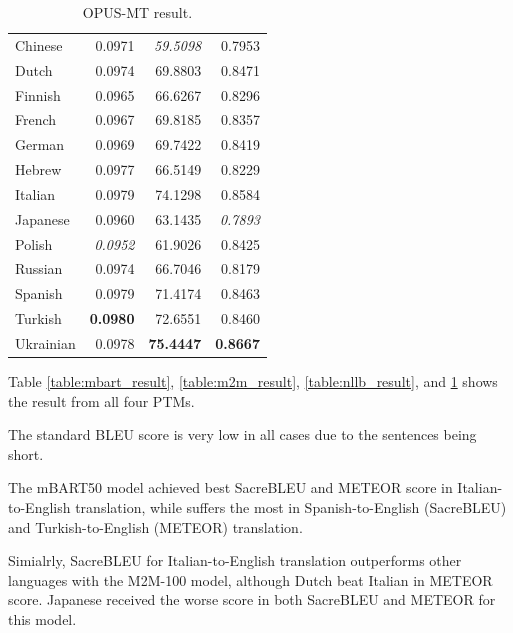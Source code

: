 \documentclass[a4paper]{article}
\begin{document}
\begin{table}[htbp]
\begin{minipage}{0.49\linewidth}
\begin{tabular}{|l|r|r|r|}
            \hline
            Chinese           & 0.0971          & \textit{59.5098}   & 0.7953          \\
            Dutch             & 0.0974          & 69.8803            & 0.8471          \\
            Finnish           & 0.0965          & 66.6267            & 0.8296          \\
            French            & 0.0967          & 69.8185            & 0.8357          \\
            German            & 0.0969          & 69.7422            & 0.8419          \\
            Hebrew            & 0.0977          & 66.5149            & 0.8229          \\
            Italian           & 0.0979          & 74.1298            & 0.8584          \\
            Japanese          & 0.0960          & 63.1435            & \textit{0.7893} \\
            Polish            & \textit{0.0952} & 61.9026            & 0.8425          \\
            Russian           & 0.0974          & 66.7046            & 0.8179          \\
            Spanish           & 0.0979          & 71.4174            & 0.8463          \\
            Turkish           & \textbf{0.0980} & 72.6551            & 0.8460          \\
            Ukrainian         & 0.0978          & \textbf{75.4447}   & \textbf{0.8667} \\
            \hline
        \end{tabular}
        \caption{OPUS-MT result.}
        \label{table:opus_result}
    \end{minipage}
\end{table}

Table \ref{table:mbart_result}, \ref{table:m2m_result}, \ref{table:nllb_result}, and \ref{table:opus_result} shows the result from all four PTMs.

The standard BLEU score is very low in all cases due to the sentences being short.

The mBART50 model achieved best SacreBLEU and METEOR score in Italian-to-English translation, while suffers the most in Spanish-to-English (SacreBLEU) and Turkish-to-English (METEOR) translation.

Simialrly, SacreBLEU for Italian-to-English translation outperforms other languages with the M2M-100 model, although Dutch beat Italian in METEOR score. Japanese received the worse score in both SacreBLEU and METEOR for this model.
\end{document}
